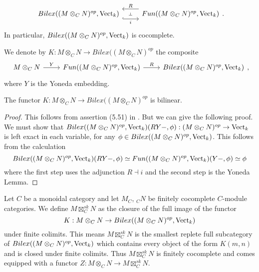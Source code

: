 \[\begin{tikzcd}
	{Bilex((M\otimes_C N)^{op},\Vect_k)} & {Fun((M\otimes_C N)^{op},\Vect_k)}
	\arrow[""{name=0, anchor=center, inner sep=0}, "i"', shift right=3, hook, from=1-1, to=1-2]
	\arrow[""{name=1, anchor=center, inner sep=0}, "R"', shift right=3, from=1-2, to=1-1]
	\arrow["\dashv"{anchor=center, rotate=-90}, draw=none, from=1, to=0]
\end{tikzcd}.\] In particular, $Bilex((M\otimes_C N)^{op},\operatorname{Vect}_k)$ is cocomplete.

\begin{definition}\label{def_K}
We denote by $K:M\otimes_C N\to Bilex((M\otimes_C N)^{op}$ the composite \[\begin{tikzcd}
	{M\otimes_C N} & {Fun((M\otimes_C N)^{op},\Vect_k)} & {Bilex((M\otimes_C N)^{op},\Vect_k)}
	\arrow["Y", from=1-1, to=1-2]
	\arrow["R", from=1-2, to=1-3]
\end{tikzcd},\] where $Y$ is the Yoneda embedding.\end{definition}
\begin{lemma}\label{right_exact_0}

The functor $K:M\otimes_C N\to Bilex((M\otimes_C N)^{op}$ is bilinear.\end{lemma}

\begin{proof}

This follows from assertion (5.51) in \cite{kelly/basic-concepts-enriched}. But we can give the following proof. We must show that $Bilex((M\otimes_C N)^{op},\operatorname{Vect}_k)(RY-,\phi):(M\otimes_C N)^{op}\to\operatorname{Vect}_k$ is left exact in each variable, for any $\phi\in Bilex((M\otimes_C N)^{op},\operatorname{Vect}_k)$. This follows from the calculation $$Bilex((M\otimes_C N)^{op},\operatorname{Vect}_k)(RY-,\phi)\simeq Fun((M\otimes_C N)^{op},\operatorname{Vect}_k)(Y-,\phi)\simeq \phi$$ where the first step uses the adjunction $R\dashv i$ and the second step is the Yoneda Lemma.\end{proof}

\begin{definition}\label{sk_nonsemisimple} Let $C$ be a monoidal category and let $M_C$, $_{C}N$ be finitely cocomplete $C$-module categories. We define $M\boxtimes_C^{sk}N$ as the closure of the full image of the functor $$K:M\otimes_C N \to Bilex((M\otimes_C N)^{op},\operatorname{Vect}_k)$$ under finite colimits. This means $M\boxtimes_C^{sk}N$ is the smallest replete full subcategory of $Bilex((M\otimes_C N)^{op},\operatorname{Vect}_k)$ which contains every object of the form $K(m,n)$ and is closed under finite colimits. Thus $M\boxtimes_C^{sk}N$ is finitely cocomplete and comes equipped with a functor $Z:M\otimes_C N \to M\boxtimes_C^{sk}N$.\end{definition}

